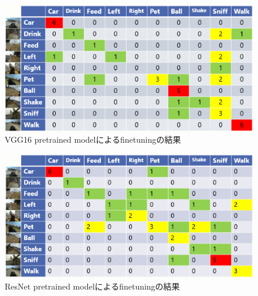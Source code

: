 \begin{figure}[htbp]
   \begin{center}
    
    \includegraphics[scale=0.3]{./Img/vgg16_res.eps}
    \caption{VGG16 pretrained modelによるfinetuningの結果}
    \label{vgg16_res}
   \end{center}
\end{figure}
\begin{figure}[htbp]

   \begin{center}

    \includegraphics[scale=0.3]{./Img/resnet_res.eps}
  \caption{ResNet pretrained modelによるfinetuningの結果}
  \label{resnet_res}
   \end{center}

\end{figure}

